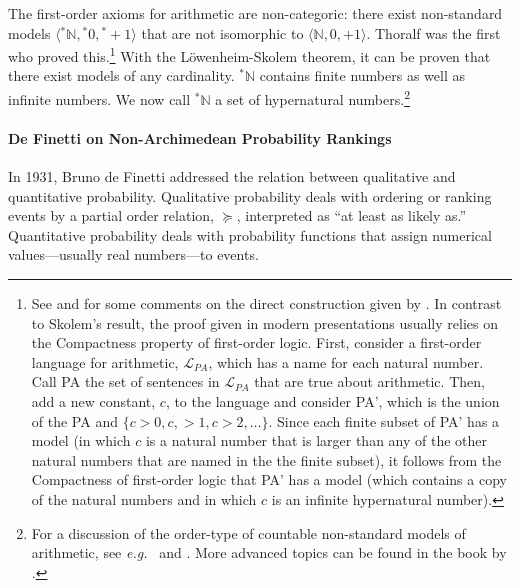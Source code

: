 The first-order axioms for arithmetic are non-categoric: there exist non-standard models $\langle {^\ast\mathbb{N}},{^\ast0},{^\ast+}{1} \rangle$ that are not isomorphic to $\langle \mathbb{N},0,+1 \rangle$. Thoralf \citet{Skolem:1934} was the first who proved this.\footnote{See \citet[section~3]{Stillwell:1977} and \citet[section~3.2]{Kanovei_etal:2013} for some comments on the direct construction given by \citet{Skolem:1934}. In contrast to Skolem's result, the proof given in modern presentations usually relies on the Compactness property of first-order logic. First, consider a first-order language for arithmetic, $\mathcal{L}_{PA}$, which has a name for each natural number. Call PA the set of sentences in $\mathcal{L}_{PA}$ that are true about arithmetic. Then, add a new constant, $c$, to the language and consider PA', which is the union of the PA and $\{c>0,c,>1,c>2, \ldots\}$. Since each finite subset of PA' has a model (in which $c$ is a natural number that is larger than any of the other natural numbers that are named in the the finite subset), it follows from the Compactness of first-order logic that PA' has a model (which contains a copy of the natural numbers and in which $c$ is an infinite hypernatural number).\label{fn:Skolem}} With the L\"{o}wenheim-Skolem theorem, it can be proven that there exist models of any cardinality. ${^\ast\mathbb{N}}$ contains finite numbers as well as infinite numbers. We now call ${^\ast\mathbb{N}}$ a set of hypernatural numbers.\footnote{For a discussion of the order-type of countable non-standard models of arithmetic, see \textit{e.g.}\ \citet[Ch.~25, p.~302--318]{Boolos_etal:2007} and \citet{McGee:2002}. More advanced topics can be found in the book by \citet{KossakSchmerl:2006}.}

\paragraph{De Finetti on Non-Archimedean Probability Rankings}\label{sec:dF}
In 1931, Bru\-no de Finetti addressed the relation between qualitative and quantitative probability. Qualitative probability deals with ordering or ranking events by a partial order relation, $\succeq$, interpreted as ``at least as likely as.'' Quantitative probability deals with probability functions that assign numerical values---usually real numbers---to events.


